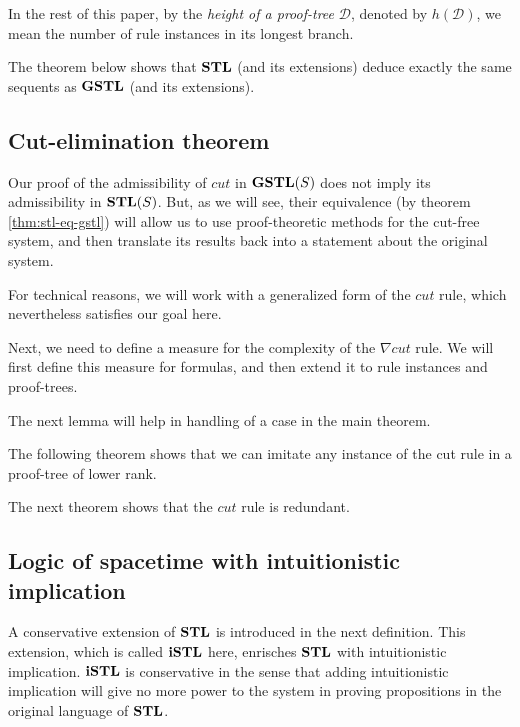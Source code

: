 \documentclass[10pt,a4paper]{amsart}
\begin{document}



In the rest of this paper, by the \emph{height of a proof-tree} $\mathcal{D}$, denoted by $h(\mathcal{D})$, we mean the number of rule instances in its longest branch.

The theorem below shows that $\mathbf{STL}$ (and its extensions) deduce exactly the same sequents as $\mathbf{GSTL}$ (and its extensions).




\subsection{Cut-elimination theorem}
Our proof of the admissibility of $cut$ in $\mathbf{GSTL}(S)$ does not imply its admissibility in $\mathbf{STL}(S)$. But, as we will see, their equivalence (by theorem \ref{thm:stl-eq-gstl}) will allow us to use proof-theoretic methods for the cut-free system, and then translate its results back into a statement about the original system.

For technical reasons, we will work with a generalized form of the $cut$ rule, which nevertheless satisfies our goal here.





Next, we need to define a measure for the complexity of the $\nabla cut$ rule. We will first define this measure for formulas, and then extend it to rule instances and proof-trees.



The next lemma will help in handling of a case in the main theorem.



The following theorem shows that we can imitate any instance of the cut rule in a proof-tree of lower rank.



The next theorem shows that the $cut$ rule is redundant.



\subsection{Logic of spacetime with intuitionistic implication}
A conservative extension of $\mathbf{STL}$ is introduced in the next definition. This extension, which is called $\mathbf{iSTL}$ here, enrisches $\mathbf{STL}$ with intuitionistic implication. $\mathbf{iSTL}$ is conservative in the sense that adding intuitionistic implication will give no more power to the system in proving propositions in the original language of $\mathbf{STL}$.
\end{document}

